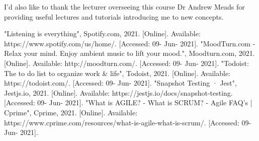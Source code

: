 \documentclass[conference]{IEEEtran}
\begin{document}
I'd also like to thank the lecturer overseeing this course Dr Andrew Meads for providing useful lectures and tutorials introducing me to new concepts.

\begin{thebibliography}{00}
 "Listening is everything", Spotify.com, 2021. [Online]. Available: https://www.spotify.com/us/home/. [Accessed: 09- Jun- 2021].
 "MoodTurn.com - Relax your mind. Enjoy ambient music to lift your mood.", Moodturn.com, 2021. [Online]. Available: http://moodturn.com/. [Accessed: 09- Jun- 2021].
 "Todoist: The to do list to organize work \& life", Todoist, 2021. [Online]. Available: https://todoist.com/. [Accessed: 09- Jun- 2021].
"Snapshot Testing · Jest", Jestjs.io, 2021. [Online]. Available: https://jestjs.io/docs/snapshot-testing. [Accessed: 09- Jun- 2021].
"What is AGILE? - What is SCRUM? - Agile FAQ's | Cprime", Cprime, 2021. [Online]. Available: https://www.cprime.com/resources/what-is-agile-what-is-scrum/. [Accessed: 09- Jun- 2021].


\end{thebibliography}
\end{document}

